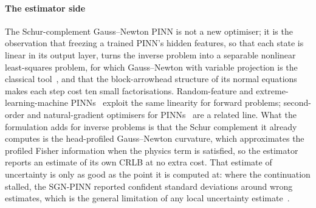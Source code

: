 \paragraph{The estimator side} The Schur-complement Gauss--Newton PINN is not a
new optimiser; it is the observation that freezing a trained PINN's hidden features, so that each
state is linear in its output layer, turns the inverse problem into a separable
nonlinear least-squares problem, for which Gauss--Newton with variable projection is the classical
tool~\citep{golub1973differentiation,golub2003separable,oleary2013varpro}, and
that the block-arrowhead structure of its normal equations makes each step cost
ten small factorisations. Random-feature and extreme-learning-machine
PINNs~\citep{huang2006elm,dong2021local,dong2023inverse} exploit the same
linearity for forward problems; second-order and natural-gradient optimisers
for PINNs~\citep{muller2023ngd,jnini2024gauss} are a related line. What the
formulation adds for inverse problems is that the Schur complement it already
computes is the head-profiled Gauss--Newton curvature, which approximates the
profiled Fisher information when the physics term is satisfied, so the
estimator reports an estimate of its own CRLB at no extra cost. That estimate of uncertainty is only as good as the point
it is computed at: where the continuation stalled, the SGN-PINN reported
confident standard deviations around wrong estimates, which is the general
limitation of any local uncertainty estimate~\citep{transtrum2015perspective}.

